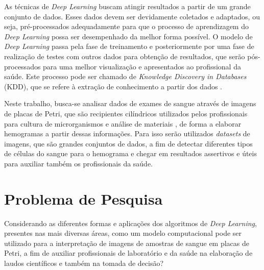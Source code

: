 As técnicas de \emph{Deep Learning} buscam atingir resultados a partir de um grande conjunto de dados. Esses dados devem ser devidamente coletados e adaptados, ou seja, pré-processados adequadamente para que o processo de aprendizagem do \emph{Deep Learning} possa ser desempenhado da melhor forma possível. O modelo de \emph{Deep Learning} passa pela fase de treinamento e posteriormente por uma fase de realização de testes com outros dados para obtenção de resultados, que serão pós-processados para uma melhor visualização e apresentados ao profissional da saúde. Este processo pode ser chamado de \emph{Knowledge Discovery in Databases} (KDD), que se refere à extração de conhecimento a partir dos dados \cite{kdd, kdd2}.

Neste trabalho, busca-se analisar dados de exames de sangue através de imagens de placas de Petri, que são recipientes cilíndricos utilizados pelos profissionais para cultura de microrganismos e análise de materiais \cite{petri}, de forma a elaborar hemogramas a partir dessas informações. Para isso serão utilizados \emph{datasets} de imagens, que são grandes conjuntos de dados, a fim de detectar diferentes tipos de células do sangue para o hemograma e chegar em resultados assertivos e úteis para auxiliar também os profissionais da saúde.


\section{Problema de Pesquisa}
\label{sec:problema}

Considerando as diferentes formas e aplicações dos algoritmos de \emph{Deep Learning}, presentes nas mais diversas áreas, como um modelo computacional pode ser utilizado para a interpretação de imagens de amostras de sangue em placas de Petri, a fim de auxiliar profissionais de laboratório e da saúde na elaboração de laudos científicos e também na tomada de decisão?


